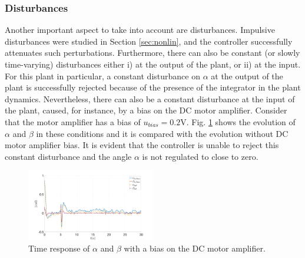 \documentclass[letterpaper, 10 pt, conference]{ieeeconf}
\begin{document}
\subsubsection{Disturbances} Another important aspect to take into account are disturbances. Impulsive disturbances were studied in Section \ref{sec:nonlin}, and the controller successfully attenuates such perturbations. Furthermore, there can also be constant (or slowly time-varying) disturbances either i) at the output of the plant, or ii) at the input. For this plant in particular, a constant disturbance on $\alpha$ at the output of the plant is successfully rejected because of the presence of the integrator in the plant dynamics. Nevertheless, there can also be a constant disturbance at the input of the plant, caused, for instance, by a bias on the DC motor amplifier. Consider that the motor amplifier has a bias of $u_{bias} = 0.2$V. Fig. \ref{fig:10_1_angles} shows the evolution of $\alpha$ and $\beta$ in these conditions and it is compared with the evolution without DC motor amplifier bias. It is evident that the controller is unable to reject this constant disturbance and the angle $\alpha$ is not regulated to close to zero.

\begin{figure}[h]
    \centering
    \includegraphics[width = 0.5\textwidth]{figures/10_1_angles.png}
    \caption{Time response of $\alpha$ and $\beta$ with a bias on the DC motor amplifier.}
    \label{fig:10_1_angles}
\end{figure}
\end{document}
